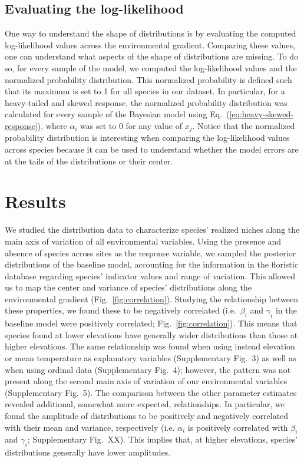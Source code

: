 \documentclass[11pt, a4paper]{article}
\begin{document}
\subsection*{Evaluating the log-likelihood}
One way to understand the shape of distributions is by evaluating the computed log-likelihood values across the environmental gradient. Comparing these values, one can understand what aspects of the shape of distributions are missing. To do so, for every sample of the model, we computed the log-likelihood values and the normalized probability distribution. This normalized probability is defined such that its maximum is set to 1 for all species in our dataset. In particular, for a heavy-tailed and skewed response, the normalized probability distribution was calculated for every sample of the Bayesian model using Eq.~(\ref{eq:heavy-skewed-response}), where $\alpha_i$ was set to 0 for any value of $x_{j}$. Notice that the normalized probability distribution is interesting when comparing the log-likelihood values across species because it can be used to understand whether the model errors are at the tails of the distributions or their center. 

\section*{Results}
We studied the distribution data to characterize species' realized niches along the main axis of variation of all environmental variables. Using the presence and absence of species across sites as the response variable, we sampled the posterior distributions of the baseline model, accounting for the information in the floristic database regarding species' indicator values and range of variation. This allowed us to map the center and variance of species' distributions along the environmental gradient (Fig.~\ref{fig:correlation}).  Studying the relationship between these properties, we found these to be negatively correlated (i.e.~$\beta_{i}$ and $\gamma_{i}$ in the baseline model were positively correlated; Fig.~\ref{fig:correlation}). This means that species found at lower elevations have generally wider distributions than those at higher elevations. The same relationship was found when using instead elevation or mean temperature as explanatory variables (Supplementary Fig.~3) as well as when using ordinal data (Supplementary Fig.~4); however, the pattern was not present along the second main axis of variation of our environmental variables (Supplementary Fig.~5). The comparison between the other parameter estimates revealed additional, somewhat more expected, relationships. In particular, we found the amplitude of distributions to be positively and negatively correlated with their mean and variance, respectively (i.e. $\alpha_{i}$ is positively correlated with $\beta_{i}$ and $\gamma_{i}$; Supplementary Fig.~XX). This implies that, at higher elevations, species' distributions generally have lower amplitudes.
\end{document}
